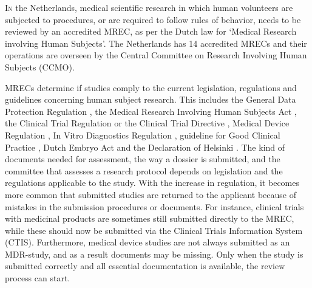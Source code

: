 \documentclass[authordate, meta]{jote-new-article}
\author[1]{\mbox{Sigrid E. M. Heinsbroek\orcid{0000-0003-0971-8599}}}
\affil[1]{METC NedMec}
\author[1]{\mbox{Vincent Bontrop\orcid{0000-0003-4009-0939}}}
\author[1]{\mbox{Rutger P. Chorus}}
\author[1]{\mbox{C. Michel Zwaan\orcid{0000-0001-6892-8268}}}
\begin{document}
\begin{frontmatter}
  \maketitle
  \begin{abstract}
    \printabstracttext
  \end{abstract}
\end{frontmatter}



\lettrine{I}{n} the Netherlands, medical scientific research in which human volunteers are subjected to procedures, or are required to follow rules of behavior, needs to be reviewed by an accredited MREC, as per the Dutch law for ‘Medical Research involving Human Subjects'. The Netherlands has 14 accredited MRECs and their operations are overseen by the Central Committee on Research Involving Human Subjects (CCMO).



MRECs determine if studies comply to the current legislation, regulations and guidelines concerning human subject research. This includes the General Data Protection Regulation \parencites[GDPR;][]{TheEuropeanParliament2016}, the Medical Research Involving Human Subjects Act \parencites[WMO;][]{NederlandseOverheid2022}, the Clinical Trial Regulation \parencites[CTR;][]{TheEuropeanParliament2014} or the Clinical Trial Directive   \parencites[CTD, till 31\textsuperscript{st} of January 2022;][]{TheEuropeanParliament2001}, Medical Device Regulation \parencites[MDR;][]{TheEuropeanParliament2021}, In Vitro Diagnostics Regulation \parencites[IVDR;][]{TheEuropeanParliament2017}, guideline for Good Clinical Practice \parencites{EuropeanMedicinesAgency2016}, Dutch Embryo Act \parencites{NederlandseOverheid2021} and the Declaration of Helsinki \parencites{TheWorldMedicalAssociation2013}. The kind of documents needed for assessment, the way a dossier is submitted, and the committee that assesses a research protocol depends on legislation and the regulations applicable to the study. With the increase in regulation, it becomes more common that submitted studies are returned to the applicant because of mistakes in the submission procedures or documents. For instance, clinical trials with medicinal products are sometimes still submitted directly to the MREC, while these should now be submitted via the Clinical Trials Information System (CTIS). Furthermore, medical device studies are not always submitted as an MDR-study, and as a result documents may be missing. Only when the study is submitted correctly and all essential documentation is available, the review process can start.
\end{document}
